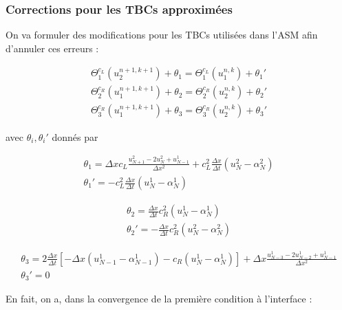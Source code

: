\subsubsection{Corrections pour les TBCs approximées}

\indent On va formuler des modifications pour les TBCs utilisées dans l'ASM afin d'annuler ces erreurs :

\begin{equation*}
    \begin{gathered}
        \Theta_1^{c_L}(u_2^{n+1,k+1}) + \theta_1 = \Theta_1^{c_L}(u_1^{n,k}) + \theta_1' \\
        \Theta_2^{c_R}(u_1^{n+1,k+1}) + \theta_2 = \Theta_2^{c_R}(u_2^{n,k}) + \theta_2' \\
        \Theta_3^{c_R}(u_1^{n+1,k+1}) + \theta_3 = \Theta_3^{c_R}(u_2^{n,k}) + \theta_3'
    \end{gathered}
\end{equation*}

\noindent avec $\theta_i, \theta_i'$  donnés par 

\begin{gather*}
    \theta_1 = \Delta x c_L \frac{u_{N+1}^2 - 2u_{N}^2 + u_{N-1}^1}{\Delta x^2} + c_L^2\frac{\Delta x}{\Delta t} \left( u_{N}^2 - \alpha_{N}^2 \right)\\
    \theta_1' = - c_L^2\frac{\Delta x}{\Delta t} \left( u_{N}^1 - \alpha_{N}^1 \right)
\end{gather*}

\begin{equation*}
\begin{gathered}
    \theta_2 = \frac{\Delta x}{\Delta t} c_R^2 (u_N^1 - \alpha_N^1) \\
    \theta_2' = -\frac{\Delta x}{\Delta t} c_R^2 (u_N^2 - \alpha_N^2)
\end{gathered}
\end{equation*}

\begin{equation*}
\begin{gathered}
    \theta_3 = 2\frac{\Delta x}{\Delta t} \left[-\Delta x(u_{N-1}^1 - \alpha_{N-1}^1) - c_R (u_N^1 - \alpha_N^1) \right] + \Delta x \frac{u_{N-3}^1 - 2u_{N-2}^1 + u_{N-1}^1}{\Delta x^2} \\
    \theta_3' = 0
\end{gathered}
\end{equation*}

\indent En fait, on a, dans la convergence de la première condition à l'interface :

